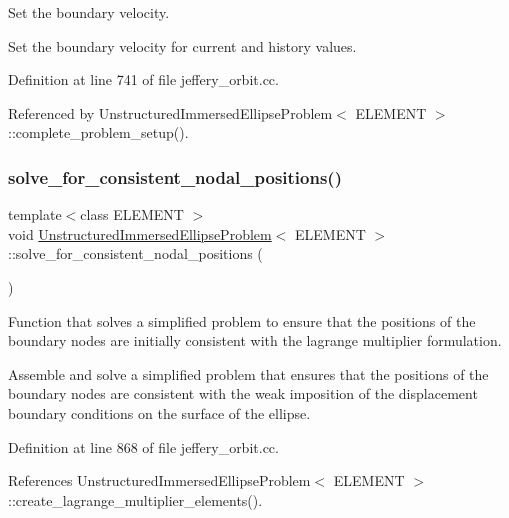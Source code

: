 Set the boundary velocity. 

Set the boundary velocity for current and history values. 

Definition at line 741 of file jeffery\+\_\+orbit.\+cc.



Referenced by Unstructured\+Immersed\+Ellipse\+Problem$<$ E\+L\+E\+M\+E\+N\+T $>$\+::complete\+\_\+problem\+\_\+setup().

\mbox{\label{classUnstructuredImmersedEllipseProblem_a2a88b40ff1988de0fc696f1eb755ea54}} 
\subsubsection{\texorpdfstring{solve\+\_\+for\+\_\+consistent\+\_\+nodal\+\_\+positions()}{solve\_for\_consistent\_nodal\_positions()}}
{\footnotesize\ttfamily template$<$class E\+L\+E\+M\+E\+NT $>$ \\
void \hyperlink{classUnstructuredImmersedEllipseProblem}{Unstructured\+Immersed\+Ellipse\+Problem}$<$ E\+L\+E\+M\+E\+NT $>$\+::solve\+\_\+for\+\_\+consistent\+\_\+nodal\+\_\+positions (\begin{DoxyParamCaption}{ }\end{DoxyParamCaption})}



Function that solves a simplified problem to ensure that the positions of the boundary nodes are initially consistent with the lagrange multiplier formulation. 

Assemble and solve a simplified problem that ensures that the positions of the boundary nodes are consistent with the weak imposition of the displacement boundary conditions on the surface of the ellipse. 

Definition at line 868 of file jeffery\+\_\+orbit.\+cc.



References Unstructured\+Immersed\+Ellipse\+Problem$<$ E\+L\+E\+M\+E\+N\+T $>$\+::create\+\_\+lagrange\+\_\+multiplier\+\_\+elements().



